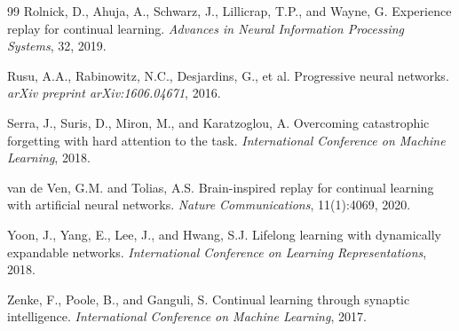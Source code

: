 \documentclass[10pt,twocolumn]{article}
\begin{document}
\begin{thebibliography}{99}
Rolnick, D., Ahuja, A., Schwarz, J., Lillicrap, T.P., and Wayne, G.
Experience replay for continual learning.
\emph{Advances in Neural Information Processing Systems}, 32, 2019.

Rusu, A.A., Rabinowitz, N.C., Desjardins, G., et al.
Progressive neural networks.
\emph{arXiv preprint arXiv:1606.04671}, 2016.

Serra, J., Suris, D., Miron, M., and Karatzoglou, A.
Overcoming catastrophic forgetting with hard attention to the task.
\emph{International Conference on Machine Learning}, 2018.

van de Ven, G.M. and Tolias, A.S.
Brain-inspired replay for continual learning with artificial neural networks.
\emph{Nature Communications}, 11(1):4069, 2020.

Yoon, J., Yang, E., Lee, J., and Hwang, S.J.
Lifelong learning with dynamically expandable networks.
\emph{International Conference on Learning Representations}, 2018.

Zenke, F., Poole, B., and Ganguli, S.
Continual learning through synaptic intelligence.
\emph{International Conference on Machine Learning}, 2017.

\end{thebibliography}
\end{document}
